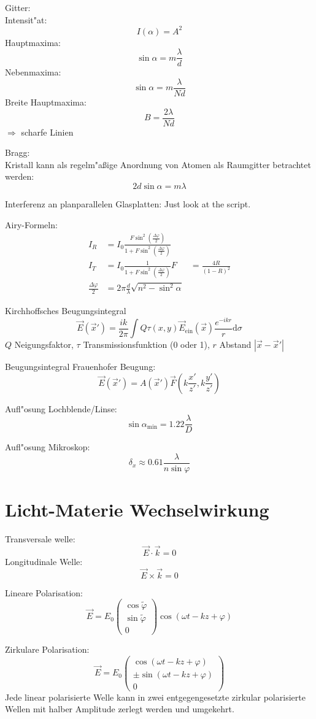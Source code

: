 \documentclass[12pt]{report}
\newcommand{\vphi}{\varphi}
\newcommand{\dd}{\mathrm{d}}
\begin{document}
Gitter:\\
Intensit"at: \[I(\alpha)=A^2\]
Hauptmaxima: \[\sin\alpha=m\frac{\lambda}{d}\]
Nebenmaxima: \[\sin\alpha=m\frac{\lambda}{Nd}\]
Breite Hauptmaxima: \[B=\frac{2\lambda}{Nd}\]
$\Rightarrow$ scharfe Linien

Bragg:\\
Kristall kann als regelm"a\ss ige Anordnung von Atomen als Raumgitter betrachtet werden:
\[2d\sin\alpha=m\lambda\]

Interferenz an planparallelen Glasplatten:
Just look at the script.

Airy-Formeln:
\begin{align*}
I_R&=I_0\frac{F\sin^2\left(\frac{\Delta\vphi}{2}\right)}{1+F\sin^2\left(\frac{\Delta\vphi}{2}\right)}\\
I_T&=I_0\frac{1}{1+F\sin^2\left(\frac{\Delta\vphi}{2}\right)}
F&=\frac{4R}{(1-R)^2}\\
\frac{\Delta\vphi}{2}&=2\pi\frac{d}{\lambda}\sqrt{n^2-\sin^2\alpha}
\end{align*}

Kirchhoffsches Beugungsintegral
\[\vec{E}(\vec{x}')=\frac{ik}{2\pi}\int Q\tau(x,y)\vec{E}_\mathrm{ein}(\vec{x})\frac{e^{-ikr}}{r}\dd\sigma\]
$Q$ Neigungsfaktor, $\tau$ Transmissionsfunktion (0 oder 1), $r$ Abstand $|\vec{x}-\vec{x}'|$

Beugungsintegral Frauenhofer Beugung:
\[\vec{E}(\vec{x}')=A(\vec{x}')\vec{F}\left(k\frac{x'}{z'},k\frac{y'}{z'}\right)\]

Aufl"osung Lochblende/Linse:
\[\sin\alpha_\mathrm{min}=1.22\frac{\lambda}{D}\]

Aufl"osung Mikroskop:
\[\delta_x\approx0.61\frac{\lambda}{n\sin\vphi}\]

\section{Licht-Materie Wechselwirkung}


Transversale welle:
\[\vec{E}\cdot\vec{k}=0\]
Longitudinale Welle:
\[\vec{E}\times\vec{k}=0\]

Lineare Polarisation:
\[\vec{E}=E_0\begin{pmatrix}\cos\tilde{\vphi}\\\sin\tilde{\vphi}\\0\end{pmatrix}\cos(\omega t-kz+\vphi)\]

Zirkulare Polarisation:
\[\vec{E}=E_0\begin{pmatrix}\cos(\omega t-kz+\vphi)\\\pm\sin(\omega t-kz+\vphi)\\0\end{pmatrix}\]
Jede linear polarisierte Welle kann in zwei entgegengesetzte zirkular polarisierte Wellen mit halber Amplitude zerlegt werden und umgekehrt.\\
\end{document}
